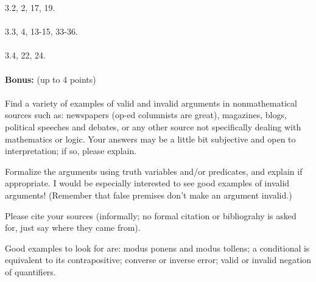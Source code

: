 \documentclass[12pt]{article}
\begin{document}
3.2, 2, 17, 19.
\\
\\
3.3, 4, 13-15, 33-36.
\\
\\
3.4, 22, 24.
\\
\\
{\bf Bonus:} (up to 4 points)
\\
\\
Find a variety of examples of valid and invalid arguments in nonmathematical sources such as:
newspapers (op-ed columnists are great), magazines, blogs, political speeches and debates,
or any other source not specifically dealing with mathematics or logic. Your answers may be a little
bit subjective and open to interpretation; if so, please explain.

Formalize the arguments using truth variables and/or predicates, and explain if appropriate. I would
be especially interested to see good examples of invalid arguments! (Remember that false premises don't
make an argument invalid.)

Please cite your sources (informally; no formal citation or bibliograhy is asked for, just say where they came from).

Good examples to look for are: modus ponens and modus tollens; a conditional is equivalent to its contrapositive;
converse or inverse error; valid or invalid negation of quantifiers.
\end{document}
